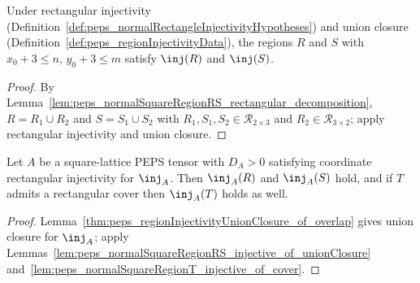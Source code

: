 \begin{lemma}%
    \label{lem:peps_normalSquareRegionRS_injective_of_unionClosure}
    \leanok
    Under rectangular injectivity
    (Definition~\ref{def:peps_normalRectangleInjectivityHypotheses}) and union
    closure (Definition~\ref{def:peps_regionInjectivityData}), the regions $R$
    and $S$ with $x_0+3\le n$, $y_0+3\le m$ satisfy $\inj(R)$ and $\inj(S)$.
\end{lemma}
\begin{proof}\leanok
    By Lemma~\ref{lem:peps_normalSquareRegionRS_rectangular_decomposition},
    $R=R_1\cup R_2$ and $S=S_1\cup S_2$ with
    $R_1,S_1,S_2\in\mathcal R_{2\times 3}$ and
    $R_2\in\mathcal R_{3\times 2}$; apply rectangular injectivity and union
    closure.
\end{proof}

\begin{lemma}%
    \label{lem:peps_normalSquareRegionRST_injective}
    \leanok
    Let $A$ be a square-lattice PEPS tensor with $D_A>0$ satisfying coordinate
    rectangular injectivity for $\inj_A$. Then $\inj_A(R)$ and $\inj_A(S)$
    hold, and if $T$ admits a rectangular cover then $\inj_A(T)$ holds as well.
\end{lemma}
\begin{proof}\leanok
    Lemma~\ref{thm:peps_regionInjectivityUnionClosure_of_overlap} gives union
    closure for $\inj_A$; apply
    Lemmas~\ref{lem:peps_normalSquareRegionRS_injective_of_unionClosure}
    and~\ref{lem:peps_normalSquareRegionT_injective_of_cover}.
\end{proof}


